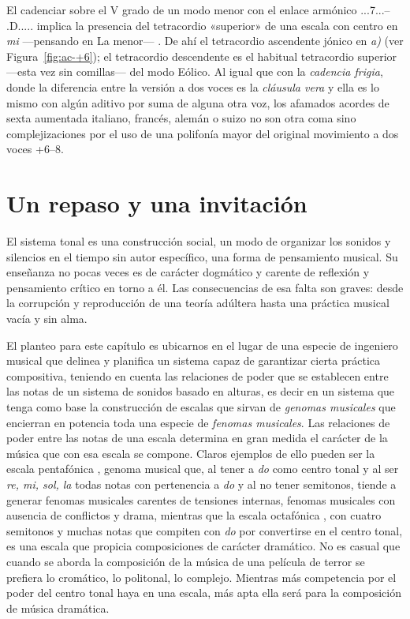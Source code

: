 \documentclass[a4paper,10pt]{article}
\begin{document}
\begin{multicols}{2}
El cadenciar sobre el V grado de un modo menor con el enlace armónico \acorde.\DD..7...-- \acorde.D..... implica la presencia del tetracordio «superior» de una escala con centro en \emph{mi} ---pensando en La menor--- . De ahí el tetracordio ascendente jónico en \emph{a)} (ver Figura~\ref{fig:ac-+6}); el tetracordio descendente  es el habitual tetracordio superior ---esta vez sin comillas--- del modo Eólico. Al igual que con la \emph{cadencia frigia}, donde la diferencia entre la versión a dos voces es la \emph{cláusula vera} y ella es lo mismo con algún aditivo por suma de alguna otra voz, los afamados acordes de sexta aumentada italiano, francés, alemán o suizo no son otra coma sino complejizaciones por el uso de una polifonía mayor del original movimiento a dos voces +6--8.

\section{Un repaso y una invitación}\label{sec:repaso-invitacion}
El sistema tonal es una construcción social, un modo de organizar los sonidos y silencios en el tiempo sin autor específico, una forma de pensamiento musical. Su enseñanza no pocas veces es de carácter dogmático y carente de reflexión y pensamiento crítico en torno a él. Las consecuencias de esa falta son graves: desde la corrupción y reproducción de una teoría adúltera hasta una práctica musical vacía y sin alma.

El planteo para este capítulo es ubicarnos en el lugar de una especie de ingeniero musical que delinea y planifica un sistema capaz de garantizar cierta práctica compositiva, teniendo en cuenta las relaciones de poder que se establecen entre las notas de un sistema de sonidos basado en alturas, es decir en un sistema que tenga como base la construcción de escalas que sirvan de \emph{genomas musicales} que encierran en potencia toda una especie de \emph{fenomas musicales}. Las relaciones de poder entre las notas de una escala determina en gran medida el carácter de la música que con esa escala se compone. Claros ejemplos de ello pueden ser la escala pentafónica \hbox{,} genoma musical que, al tener a \emph{do} como centro tonal y al ser \emph{re, mi, sol, la} todas notas con pertenencia a \emph{do} y al no tener semitonos, tiende a generar fenomas musicales carentes de tensiones internas, fenomas musicales con ausencia de conflictos y drama, mientras que la escala octafónica \hbox{,} con cuatro semitonos y muchas notas que compiten con \emph{do} por convertirse en el centro tonal, es una escala que propicia composiciones de carácter dramático. No es casual que cuando se aborda la composición de la música de una película de terror se prefiera lo cromático, lo politonal, lo complejo. Mientras más competencia por el poder del centro tonal haya en una escala, más apta ella será para la composición de música dramática.


\end{multicols}
\end{document}
